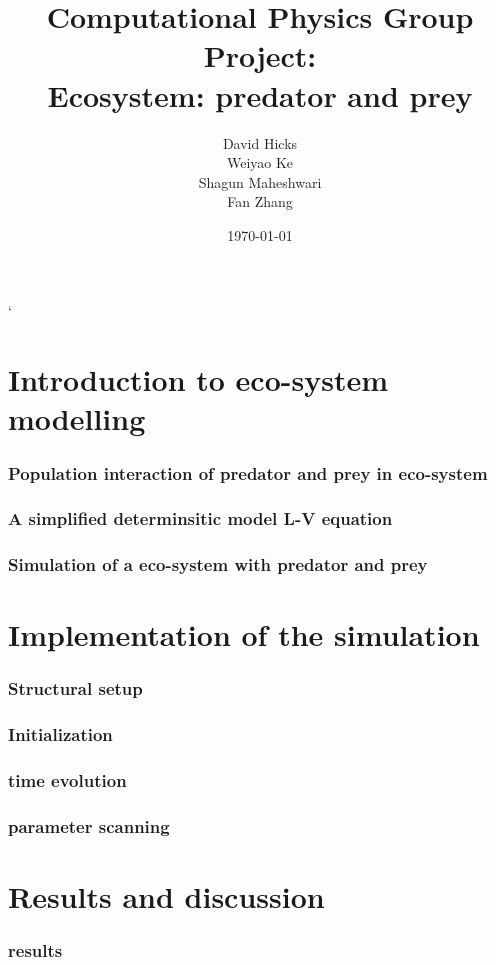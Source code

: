 \documentclass{beamer}
\title{Computational Physics Group Project: \\ Ecosystem: predator and prey}
\author{David Hicks\\ Weiyao Ke \\ Shagun Maheshwari \\ Fan Zhang}
\date{\today}
\begin{document}
`	
\frame{\titlepage}

\section[Outline]{}
\frame{\tableofcontents}

\section{Introduction to eco-system modelling}
\frame
{
  \frametitle{Population interaction of predator and prey in eco-system}
  
}
\frame
{
  \frametitle{A simplified determinsitic model L-V equation}
  
}
\frame
{
  \frametitle{Simulation of a eco-system with predator and prey}
  
}

\section{Implementation of the simulation}
\frame
{
  \frametitle{Structural setup}
  
}

\frame
{
  \frametitle{Initialization}
  
}

\frame
{
  \frametitle{time evolution}
  
}

\frame
{
  \frametitle{parameter scanning}
  
}

\section{Results and discussion}
\frame
{
  \frametitle{results}
  
}
\end{document}
